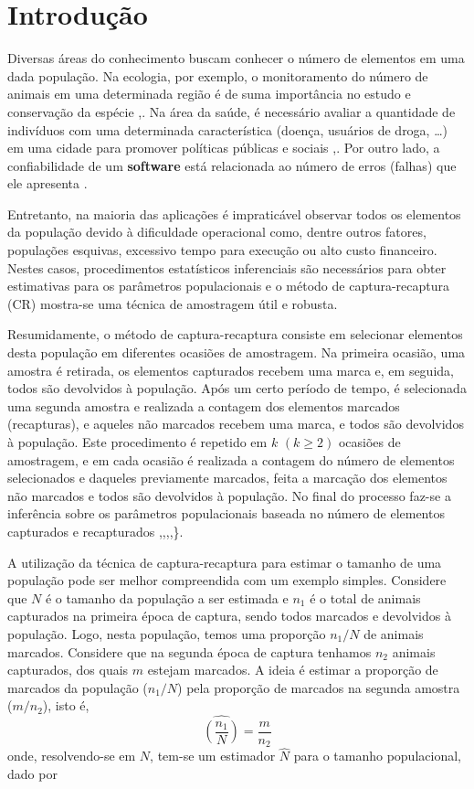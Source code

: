 \documentclass[
]{book}
\begin{document}
\hypertarget{introduuxe7uxe3o}{%
\chapter{Introdução}\label{introduuxe7uxe3o}}

Diversas áreas do conhecimento buscam conhecer o número de elementos em uma dada população.
Na ecologia, por exemplo, o monitoramento do número de animais em uma determinada região é de suma importância no estudo e conservação da espécie \citet{seber1982},\citet{mccrea2014}.
Na área da saúde, é necessário avaliar a quantidade de indivíduos com uma determinada característica (doença, usuários de droga, \ldots) em uma cidade para promover políticas públicas e sociais \citet{bird2018multiple},\citet{bohning2020estimating}.
Por outro lado, a confiabilidade de um \textbf{software} está relacionada ao número de erros (falhas) que ele apresenta \citet{basu2001bayesian}.

Entretanto, na maioria das aplicações é impraticável observar todos os elementos
da população devido à dificuldade operacional como, dentre outros fatores, populações esquivas, excessivo tempo para execução ou alto custo financeiro.
Nestes casos, procedimentos estatísticos inferenciais são necessários para obter estimativas para
os parâmetros populacionais e o método de captura-recaptura (CR) mostra-se
uma técnica de amostragem útil e robusta.

Resumidamente, o método de captura-recaptura consiste em selecionar elementos desta população em diferentes ocasiões de amostragem.
Na primeira ocasião, uma amostra é retirada, os elementos capturados recebem uma marca e, em seguida, todos são devolvidos à população.
Após um certo período de tempo, é selecionada uma segunda amostra e realizada a contagem dos elementos marcados (recapturas), e aqueles não marcados recebem uma marca, e todos são devolvidos à população.
Este procedimento é repetido em \(k\) \((k\geq2)\) ocasiões de amostragem, e em cada ocasião é realizada a contagem do número de elementos selecionados e daqueles previamente marcados, feita a marcação dos elementos não marcados e todos são devolvidos à população.
No final do processo faz-se a inferência sobre os parâmetros populacionais baseada no número de elementos capturados e recapturados \citet{otis1978},\citet{rodrigues1988bayesian},\citet{oliveira2007},\citet{salasar2011eliminaccao},\citet{wang2015}\}.

A utilização da técnica de captura-recaptura para estimar o tamanho de uma população pode ser melhor compreendida com um exemplo simples. Considere que \({N}\) é o tamanho da população a ser estimada e \(n_1\) é o total de animais capturados na primeira época de captura, sendo todos marcados e devolvidos à população. Logo, nesta população, temos uma proporção \(n_1/N\) de animais marcados. Considere que na segunda época de captura tenhamos \(n_2\) animais capturados, dos quais \(m\) estejam marcados. A ideia é estimar a proporção de marcados da população (\(n_1/N\)) pela proporção de marcados na segunda amostra (\(m/n_2\)), isto é,
\[\widehat{\left(\dfrac{n_1}{N}\right)} = \dfrac{m}{n_2}\]
onde, resolvendo-se em \(N\), tem-se um estimador \(\hat{N}\) para o tamanho populacional, dado por
\end{document}
